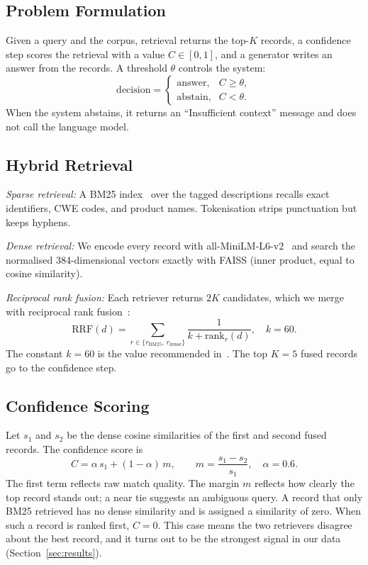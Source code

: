 \documentclass[conference]{IEEEtran}
\begin{document}
\subsection{Problem Formulation}
Given a query and the corpus, retrieval returns the top-$K$ records, a
confidence step scores the retrieval with a value $C\in[0,1]$, and a
generator writes an answer from the records. A threshold $\theta$ controls
the system:
\begin{equation}
\text{decision}=
\begin{cases}
\text{answer}, & C \ge \theta,\\[2pt]
\text{abstain}, & C < \theta.
\end{cases}
\label{eq:gate}
\end{equation}
When the system abstains, it returns an ``Insufficient context'' message
and does not call the language model.

\subsection{Hybrid Retrieval}
\noindent\textit{Sparse retrieval:} A BM25 index~\cite{ref_bm25} over the
tagged descriptions recalls exact identifiers, CWE codes, and product
names. Tokenisation strips punctuation but keeps hyphens.

\noindent\textit{Dense retrieval:} We encode every record with
all-MiniLM-L6-v2~\cite{ref_sbert} and search the normalised
384-dimensional vectors exactly with FAISS (inner product, equal to cosine
similarity).

\noindent\textit{Reciprocal rank fusion:} Each retriever returns $2K$
candidates, which we merge with reciprocal rank fusion~\cite{ref_rrf}:
\begin{equation}
\mathrm{RRF}(d)=\!\!\sum_{r\in\{r_{\mathrm{BM25}},\,r_{\mathrm{dense}}\}}\!\!
\frac{1}{k+\mathrm{rank}_r(d)},\quad k=60.
\label{eq:rrf}
\end{equation}
The constant $k=60$ is the value recommended in~\cite{ref_rrf}. The top
$K=5$ fused records go to the confidence step.

\subsection{Confidence Scoring}
Let $s_1$ and $s_2$ be the dense cosine similarities of the first and
second fused records. The confidence score is
\begin{equation}
C=\alpha\, s_1+(1-\alpha)\,m,\qquad
m=\frac{s_1-s_2}{s_1},\quad \alpha=0.6.
\label{eq:conf}
\end{equation}
The first term reflects raw match quality. The margin $m$ reflects how
clearly the top record stands out; a near tie suggests an ambiguous query.
A record that only BM25 retrieved has no dense similarity and is assigned
a similarity of zero. When such a record is ranked first, $C=0$. This case
means the two retrievers disagree about the best record, and it turns out
to be the strongest signal in our data (Section~\ref{sec:results}).
\end{document}
